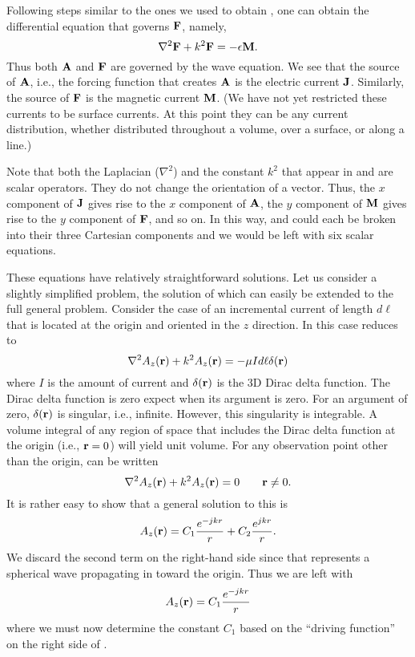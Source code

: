 Following steps similar to the ones we used to obtain
, one can obtain the differential equation
that governs $\mathbf{F}$, namely,
\begin{equation}
  \nabla^2 \mathbf{F} + k^2 \mathbf{F} = -\epsilon \mathbf{M}.\label{eq:fVecDiffEq} 
\end{equation}
Thus both $\mathbf{A}$ and $\mathbf{F}$ are governed by the wave equation.  We
see that the source of $\mathbf{A}$, i.e., the forcing function that
creates $\mathbf{A}$ is the electric current $\mathbf{J}$.  Similarly, the
source of $\mathbf{F}$ is the magnetic current $\mathbf{M}$.  (We have not yet
restricted these currents to be surface currents.  At this point they
can be any current distribution, whether distributed throughout a
volume, over a surface, or along a line.)

Note that both the Laplacian ($\nabla^2$) and the constant $k^2$ that
appear in  and  are scalar
operators.  They do not change the orientation of a vector.  Thus, the
$x$ component of $\mathbf{J}$ gives rise to the $x$ component of $\mathbf{A}$,
the $y$ component of $\mathbf{M}$ gives rise to the $y$ component of
$\mathbf{F}$, and so on.  In this way,  and
 could each be broken into their three
Cartesian components and we would be left with six scalar equations.

These equations have relatively straightforward solutions.  Let us
consider a slightly simplified problem, the solution of which can
easily be extended to the full general problem.  Consider the case of
an incremental current of length $d\ell$ that is located at
the origin and oriented in the $z$ direction.  In this case 
 reduces to 
\begin{equation}
  \nabla^2 A_z(\mathbf{r}) + k^2 A_z(\mathbf{r}) = -\mu I d\ell \delta(\mathbf{r})
  \label{eq:azGoverningEq}
\end{equation}
where $I$ is the amount of current and $\delta(\mathbf{r})$ is the 3D Dirac
delta function.  The Dirac
delta function is zero expect when its argument is zero.  For an
argument of zero, $\delta(\mathbf{r})$ is singular, i.e., infinite.
However, this singularity is integrable.  A volume integral of any
region of space that includes the Dirac delta function at the origin
(i.e., $\mathbf{r}=0$) will yield unit volume.  For any observation point
other than the origin,  can be written
\begin{equation}
  \nabla^2 A_z(\mathbf{r}) + k^2 A_z(\mathbf{r}) = 0 \qquad \mathbf{r}\neq 0.
\end{equation}
It is rather easy to show that a general solution to this is
\begin{equation}
  A_z(\mathbf{r}) = C_1\frac{e^{-jkr}}{r} +  C_2\frac{e^{jkr}}{r}.
\end{equation}
We discard the second term on the right-hand side since that
represents a spherical wave propagating in toward the origin.  Thus we
are left with
\begin{equation}
  A_z(\mathbf{r}) = C_1\frac{e^{-jkr}}{r}
\end{equation}
where we must now determine the constant $C_1$ based on the ``driving
function'' on the right side of .

